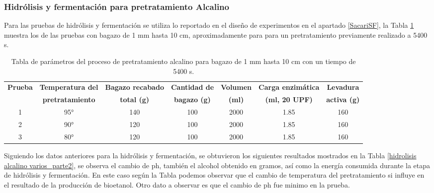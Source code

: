 \documentclass[12pt]{article}
\begin{document}
	
	
	\subsubsection{ Hidrólisis y fermentación para pretratamiento Alcalino}
	
	Para las pruebas de hidrólisis y fermentación se utiliza lo reportado en el diseño de experimentos en el apartado \ref{SacariSF}, la Tabla \ref{hidrolisis alcalino varios_parte1} muestra los de las pruebas con bagazo de 1 mm hasta 10 cm, aproximadamente para para un pretratamiento previamente realizado a 5400 s.
	
	
	
	\begin{table}[h!]
		\centering
		\caption{Tabla de parámetros del proceso de pretratamiento alcalino para bagazo de 1 mm hasta 10 cm con un tiempo de 5400 s. }
		\label{hidrolisis alcalino varios_parte1}
		\resizebox{16cm}{!} {
			\begin{tabular}{|c|c|c|c|c|c|c|}
				\hline
				\textbf{Prueba}	& \textbf{Temperatura del} & \textbf{Bagazo recabado} & \textbf{Cantidad de} & \textbf{Volumen} & \textbf{Carga enzimática} & \textbf{Levadura} \\
				&	\textbf{pretratamiento} & \textbf{total (g)} & \textbf{bagazo (g)} & \textbf{(ml)} & \textbf{(ml, 20 UPF)} & \textbf{activa (g)} \\ \hline		
				1	&	95° & 140 & 100 & 2000 & 1.85 & 160 \\ \hline

				2	&	90° & 120 & 100 & 2000 & 1.85 & 160 \\ \hline

						3	&	80° & 120 & 100 & 2000 & 1.85 & 160 \\ \hline

		\end{tabular} }
		
	\end{table}
	
	Siguiendo los datos anteriores para la hidrólisis y fermentación, se obtuvieron los siguientes resultados mostrados en la Tabla \ref{hidrolisis alcalino varios_parte2}, se observa el cambio de ph, también el alcohol obtenido en gramos, así como la energía consumida durante la etapa de hidrólisis y fermentación. En este caso según la Tabla podemos observar que el cambio de temperatura del pretratamiento si influye en el resultado de la producción de bioetanol. Otro dato a observar es que el cambio de ph fue minimo en la prueba.
	
\end{document}
